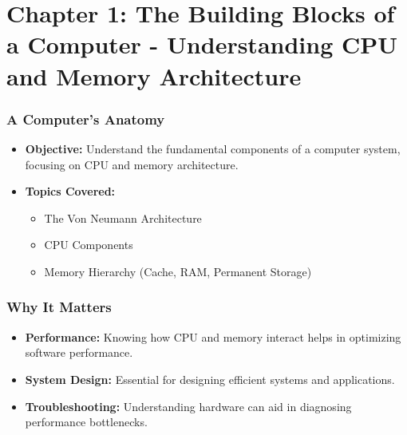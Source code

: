\section{Chapter 1: The Building Blocks of a Computer - Understanding CPU and Memory Architecture}
\label{sec:chapter_1_coa}
\begin{frame} 
    \frametitle{A Computer's Anatomy}

    \begin{itemize}
        \item \textbf{Objective:} Understand the fundamental components of a computer system, focusing on CPU and memory architecture.
        \item \textbf{Topics Covered:}
        \begin{itemize}
            \item The Von Neumann Architecture
            \item CPU Components
            \item Memory Hierarchy (Cache, RAM, Permanent Storage)
        \end{itemize}
    \end{itemize}
\end{frame}

\begin{frame} 
    \frametitle{Why It Matters}

    \begin{itemize}
        \item \textbf{Performance:} Knowing how CPU and memory interact helps in optimizing software performance.
        \item \textbf{System Design:} Essential for designing efficient systems and applications.
        \item \textbf{Troubleshooting:} Understanding hardware can aid in diagnosing performance bottlenecks.
    \end{itemize}
\end{frame}



